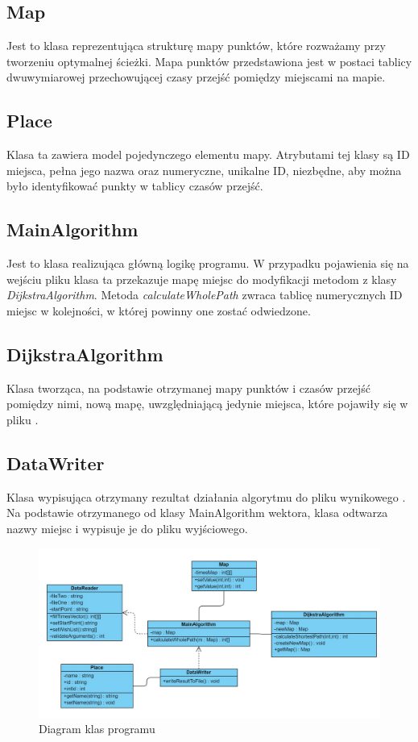 \documentclass[12pt,a4paper]{article}
\begin{document}
\subsection{Map}
Jest to klasa reprezentująca strukturę mapy punktów, które rozważamy przy tworzeniu optymalnej ścieżki. Mapa punktów przedstawiona jest w postaci tablicy dwuwymiarowej przechowującej czasy przejść pomiędzy miejscami na mapie.
\subsection{Place}
Klasa ta zawiera model pojedynczego elementu mapy. Atrybutami tej klasy są ID miejsca, pełna jego nazwa oraz numeryczne, unikalne ID, niezbędne, aby można było identyfikować punkty w tablicy czasów przejść.
\subsection{MainAlgorithm}
Jest to klasa realizująca główną logikę programu. W przypadku pojawienia się na wejściu pliku  klasa ta przekazuje mapę miejsc do modyfikacji metodom z klasy \textsl{DijkstraAlgorithm}.
Metoda \textsl{calculateWholePath} zwraca tablicę numerycznych ID miejsc w kolejności, w której powinny one zostać odwiedzone.
\subsection{DijkstraAlgorithm}
Klasa tworząca, na podstawie otrzymanej mapy punktów i czasów przejść pomiędzy nimi, nową mapę, uwzględniającą jedynie miejsca, które pojawiły się w pliku .
\subsection{DataWriter}
Klasa wypisująca otrzymany rezultat działania algorytmu do pliku wynikowego . Na podstawie otrzymanego od klasy MainAlgorithm wektora, klasa odtwarza nazwy miejsc i wypisuje je do pliku wyjściowego.
\begin{figure}[h!]
\includegraphics[width=\linewidth]{ClassDiagram.jpg}
\caption{Diagram klas programu}
\end{figure}
\end{document}
